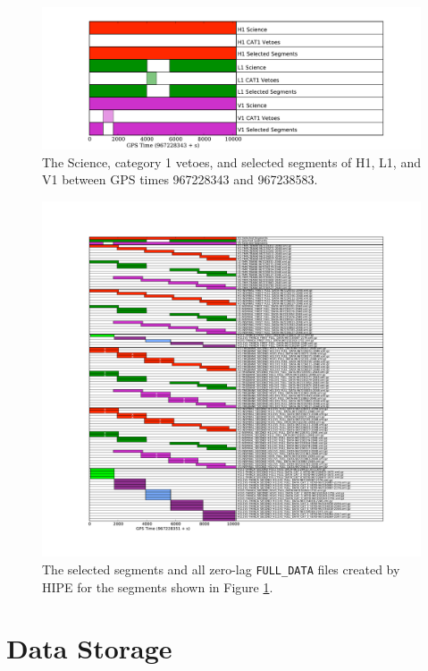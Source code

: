 \begin{figure}[p]
\label{fig:science-selected_segs}
\begin{center}
\includegraphics[width=6in]{figures/segment_plot_science-selected.pdf}
\end{center}
\caption{
The Science, category 1 vetoes, and selected segments of H1, L1, and V1 between GPS times 967228343 and 967238583.}
\end{figure}

\begin{figure}[p]
\label{fig:segment_plot_full}
\includegraphics[width=6.5in]{figures/segment_plot_selected_segs-thinca_second.pdf}
\caption{
The selected segments and all zero-lag \texttt{FULL\_DATA} files created by \ac{HIPE} for the segments shown in Figure \ref{fig:science-selected_segs}.}
\end{figure}

\section{Data Storage}
\label{sec:data_storage}

